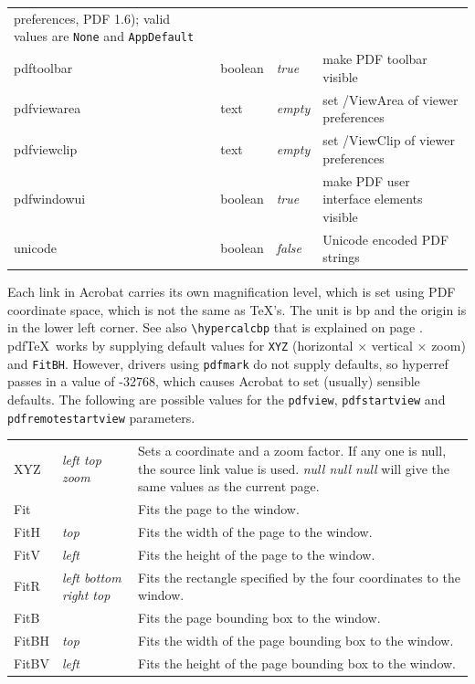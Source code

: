 \documentclass[pdftex]{article}
\begin{document}
\begin{longtable}{@{}>{\ttfamily}l>{\raggedright}p{}>{\itshape}lp{7cm}@{}}
                                       preferences, PDF 1.6);
                                       valid values are \texttt{None} and
                                       \texttt{AppDefault} \\
pdftoolbar         & boolean & true  & make PDF toolbar visible \\
pdfviewarea        & text    & empty & set /ViewArea of viewer preferences \\
pdfviewclip        & text    & empty & set /ViewClip of viewer preferences \\
pdfwindowui        & boolean & true  & make PDF user interface elements visible \\
unicode            & boolean & false & Unicode encoded PDF strings
\end{longtable}

Each link in Acrobat carries its own magnification level, which is set
using PDF coordinate space, which is not the same as \TeX's. The unit
is bp and the origin is in the lower left corner. See also
\verb|\hypercalcbp| that is explained on page \pageref{hypercalcbp}.
pdf\TeX\
works by supplying default values for \texttt{XYZ} (horizontal $\times$
vertical $\times$ zoom) and \texttt{FitBH}. However, drivers using
\texttt{pdfmark} do not supply defaults, so \textsf{hyperref} passes in
a value of -32768, which causes Acrobat to set (usually) sensible
defaults. The following are possible values for the \texttt{pdfview},
\texttt{pdfstartview} and \texttt{pdfremotestartview} parameters.

\noindent\begin{longtable}{>{\ttfamily}l>{\itshape}lp{7cm}}
XYZ   & left top zoom         & Sets a coordinate and a zoom factor. If any one is null, the source link value is used.
                                \textit{null null null} will give the same values as the current page. \\
Fit   &                       & Fits the page to the window. \\
FitH  & top                   & Fits the width of the page to the window. \\
FitV  & left                  & Fits the height of the page to the window. \\
FitR  & left bottom right top & Fits the rectangle specified by the four coordinates to the window. \\
FitB  &                       & Fits the page bounding box to the window. \\
FitBH & top                   & Fits the width of the page bounding box to the window. \\
FitBV & left                  & Fits the height of the page bounding box to the window. \\
\end{longtable}
\end{document}
